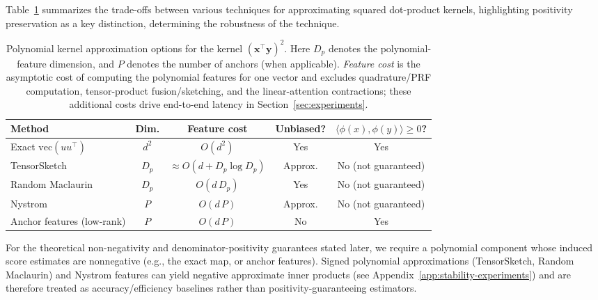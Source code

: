 \documentclass{article}
\begin{document}
Table~\ref{tab:poly-approximations} summarizes the trade-offs between various techniques for approximating squared dot-product kernels, highlighting positivity preservation as a key distinction, determining the robustness of the technique. 

\begin{table}[t]
\centering
\small
\caption{Polynomial kernel approximation options for the kernel $(\mathbf{x}^\top \mathbf{y})^2$. Here $D_p$ denotes the polynomial-feature dimension, and $P$ denotes the number of anchors (when applicable). \emph{Feature cost} is the asymptotic cost of computing the polynomial features for one vector and excludes quadrature/PRF computation, tensor-product fusion/sketching, and the linear-attention contractions; these additional costs drive end-to-end latency in Section~\ref{sec:experiments}.}
\label{tab:poly-approximations}
\begin{tabular*}{\textwidth}{@{\extracolsep{\fill}}lcccc}
\toprule
Method & Dim. & Feature cost & Unbiased? & $\langle\phi(x),\phi(y)\rangle\ge 0$? \\
\midrule
Exact $\mathrm{vec}(uu^\top)$ & $d^2$ & $O(d^2)$ & Yes & Yes \\
TensorSketch \citep{pham2013} & $D_p$ & $\approx O(d + D_p\log D_p)$ & Approx. & No (not guaranteed) \\
Random Maclaurin \citep{karkarnick2012} & $D_p$ & $O(d\,D_p)$ & Yes & No (not guaranteed) \\
Nystrom \citep{williams2001nystrom} & $P$ & $O(d\,P)$ & Approx. & No (not guaranteed) \\
Anchor features (low-rank) \citep{scholkopf2002learning} & $P$ & $O(d\,P)$ & No & Yes \\
\bottomrule
\end{tabular*}
\end{table}

For the theoretical non-negativity and denominator-positivity guarantees stated later, we require a polynomial component whose induced score estimates are nonnegative (e.g., the exact map, or anchor features). Signed polynomial approximations (TensorSketch, Random Maclaurin) and Nystrom features can yield negative approximate inner products (see Appendix~\ref{app:stability-experiments}) and are therefore treated as accuracy/efficiency baselines rather than positivity-guaranteeing estimators.

\end{document}
